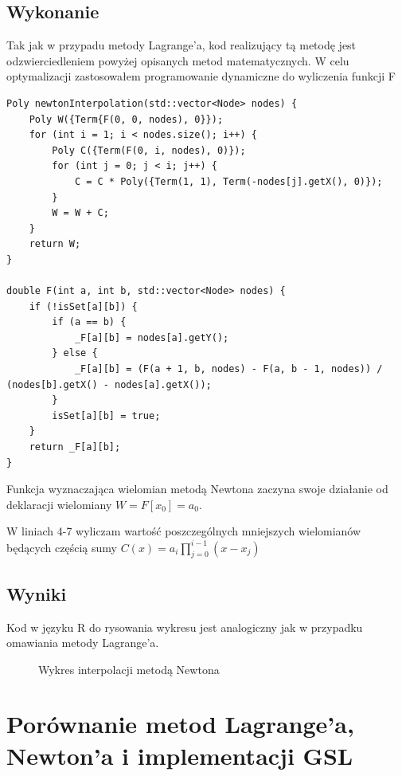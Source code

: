\documentclass{article}
\begin{document}
    \subsection{Wykonanie}
    Tak jak w przypadu metody Lagrange'a, kod realizujący tą metodę jest odzwierciedleniem powyżej opisanych metod matematycznych. 
    W celu optymalizacji zastosowałem programowanie dynamiczne do wyliczenia funkcji F 
    \lstset {language=C++}
    \begin{lstlisting}[caption={Interpolacja metodą Newtona}]
Poly newtonInterpolation(std::vector<Node> nodes) {
    Poly W({Term{F(0, 0, nodes), 0}});
    for (int i = 1; i < nodes.size(); i++) {
        Poly C({Term(F(0, i, nodes), 0)});
        for (int j = 0; j < i; j++) {
            C = C * Poly({Term(1, 1), Term(-nodes[j].getX(), 0)});
        }
        W = W + C;
    }
    return W;
}

double F(int a, int b, std::vector<Node> nodes) {
    if (!isSet[a][b]) {
        if (a == b) {
            _F[a][b] = nodes[a].getY();
        } else {
            _F[a][b] = (F(a + 1, b, nodes) - F(a, b - 1, nodes)) / (nodes[b].getX() - nodes[a].getX());
        }
        isSet[a][b] = true;
    }
    return _F[a][b];
}
    \end{lstlisting}
    \vspace{5px}

    Funkcja wyznaczająca wielomian metodą Newtona zaczyna swoje działanie od deklaracji wielomiany $W=F[x_0]=a_0$.
    
    W liniach 4-7 wyliczam wartość poszczególnych mniejszych wielomianów będących częścią sumy $C(x)=a_i\prod^{i-1}_{j=0}(x-x_j)$

    \subsection{Wyniki}
    Kod w języku R do rysowania wykresu jest analogiczny jak w przypadku omawiania metody Lagrange'a.

    \begin{figure}[h]
        \caption{\label{fig:newtonPlot} Wykres interpolacji metodą Newtona}
    \end{figure}

    \pagebreak

    \section{Porównanie metod Lagrange'a, Newton'a i implementacji GSL}
\end{document}
